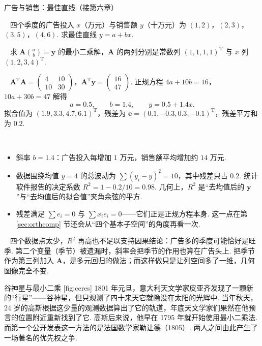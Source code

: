 \documentclass[lang=cn,10.5pt,scheme=chinese,toc=twocol,section,chinesefont=nofont,
twoside,citestyle=gb7714-2015,bibstyle=gb7714-2015]{elegantbook}
\DeclareRobustCommand{\textbf}[1]{{\lnsemiboldlatin\lnsemiboldcjk #1}}
\newcommand{\vv}[1]{\boldsymbol{#1}}
\newcommand{\trans}{\mathrm{T}}             %
\numberwithin{equation}{section}   %
\newcommand{\mstep}[1]{\par\smallskip\noindent\textbf{【#1】}\ }
\begin{document}
\begin{modelbox}{广告与销售：最佳直线（接第六章）}
  \mstep{问题} 四个季度的广告投入 $x$（万元）与销售额 $y$（十万元）为 $(1,2)$，$(2,3)$，$(3,5)$，$(4,6)$. 求最佳直线 $y=a+bx$.

  \mstep{模型} 求 $\vv A\binom ab=\vv y$ 的最小二乘解，$\vv A$ 的两列分别是常数列 $(1,1,1,1)^\trans$ 与 $x$ 列 $(1,2,3,4)^\trans$.

  \mstep{求解} $\vv A^\trans\vv A=
    \begin{pmatrix}
      4 & 10 \\10&30
    \end{pmatrix}
  $，$\vv A^\trans\vv y=
    \begin{pmatrix}
      16 \\47
    \end{pmatrix}
  $. 正规方程 $4a+10b=16$，$10a+30b=47$ 解得
  \[a=0.5,\qquad b=1.4,\qquad y=0.5+1.4x.\]
  拟合值为 $(1.9,3.3,4.7,6.1)^\trans$，残差为 $\vv e=(0.1,-0.3,0.3,-0.1)^\trans$，残差平方和为 $0.2$.

  \mstep{解读}
  \begin{itemize}
    \item 斜率 $b=1.4$：广告投入每增加 $1$ 万元，销售额平均增加约 $14$ 万元.
    \item 数据围绕均值 $\bar y=4$ 的总波动为 $\sum(y_i-\bar y)^2=10$，其中残差只占 $0.2$. 统计软件报告的\textbf{决定系数} $R^2=1-0.2/10=0.98$. 几何上，$R^2$ 是“去均值后的 $\vv y$”与“去均值后的拟合值”夹角余弦的平方.
    \item 残差满足 $\sum e_i=0$ 与 $\sum x_ie_i=0$——它们正是正规方程本身. 这一点在第 \ref{sec:orthcomp} 节还会从“四个基本子空间”的角度再看一次.%
  \end{itemize}

  \mstep{局限} 四个数据点太少，$R^2$ 再高也不足以支持因果结论：广告多的季度可能恰好是旺季. 第二个变量（季节）被遗漏时，斜率会把季节的作用也算在广告头上. 把季节作为第三列加入 $\vv A$，是多元回归的做法；而这样做只是让列空间多了一维，几何图像完全不变.
\end{modelbox}

\begin{historybox}{谷神星与最小二乘}
  [fig:ceres]
  1801 年元旦，意大利天文学家皮亚齐发现了一颗新的“行星”——谷神星，但只观测了四十来天它就隐没在太阳的光辉中. 当年秋天，24 岁的高斯根据这少量的观测数据算出了它的轨道，年底天文学家们果然在他预言的位置附近重新找到了它. 高斯后来说，他早在 1795 年就开始使用最小二乘法\cite{gauss1809theoria}. 而第一个公开发表这一方法的是法国数学家勒让德（1805）\cite{legendre1805nouvelles}. 两人之间由此产生了一场著名的优先权之争\cite{stigler1981gauss}.
\end{historybox}
\end{document}
